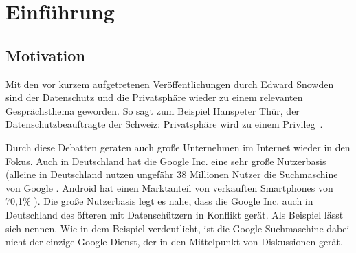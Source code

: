%
% 

\chapter{Einführung}


\section{Motivation}
Mit den vor kurzem aufgetretenen Veröffentlichungen durch Edward Snowden sind der Datenschutz und die Privatsphäre wieder zu einem relevanten Gesprächsthema geworden. So sagt zum Beispiel Hanspeter Thür, der Datenschutzbeauftragte der Schweiz: \glqq Privatsphäre wird zu einem Privileg\grqq\ \cite{nzzdatenschutzprivileg}.

Durch diese Debatten geraten auch große Unternehmen im Internet wieder in den Fokus. Auch in Deutschland hat die Google Inc. eine sehr große Nutzerbasis (alleine in Deutschland nutzen ungefähr 38 Millionen Nutzer die Suchmaschine von Google \cite{statistagoogle}. Android hat einen Marktanteil von verkauften Smartphones von 70,1\% \cite{statistaandroid}). Die große Nutzerbasis legt es nahe, dass die Google Inc. auch in Deutschland des öfteren mit Datenschützern in Konflikt gerät. Als Beispiel lässt sich \cite{geodata} nennen. Wie in dem Beispiel verdeutlicht, ist die Google Suchmaschine dabei nicht der einzige Google Dienst, der in den Mittelpunkt von Diskussionen gerät.

